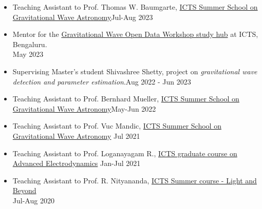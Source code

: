\begin{itemize}[noitemsep]
\item Teaching Assistant to Prof. Thomas W. Baumgarte, \href{https://www.icts.res.in/event/page/25965#Numerical%20Relativity}{ICTS Summer School on Gravitational Wave Astronomy}\hfill{Jul-Aug 2023}
\item Mentor for the \href{https://www.icts.res.in/discussion-meeting/gwodw2023}{Gravitational Wave Open Data Workshop study hub} at ICTS, Bengaluru.\\ \hfill{May 2023}
\item Supervising Master's student Shivashree Shetty, project on \textit{gravitational wave detection and parameter estimation}.\hfill{Aug 2022 - Jun 2023}
\item Teaching Assistant to Prof. Bernhard Mueller, \href{https://www.icts.res.in/event/page/23057}{ICTS Summer School on Gravitational Wave Astronomy}\hfill{May-Jun 2022}
\item Teaching Assistant to Prof. Vuc Mandic, \href{https://www.icts.res.in/event/page/21495}{ICTS Summer School on Gravitational Wave Astronomy}\hspace{4.84in} Jul 2021
\item Teaching Assistant to Prof. Loganayagam R., \href{https://courses.icts.res.in/enrol/index.php?id=12}{ICTS graduate course on Advanced Electrodynamics}\hspace{4.44in} Jan-Jul 2021
\item Teaching Assistant to Prof. R. Nityananda, \href{https://www.icts.res.in/lectures/sc-2020-light}{ICTS Summer course - Light and Beyond}\\ \hfill{Jul-Aug 2020} 
\end{itemize}